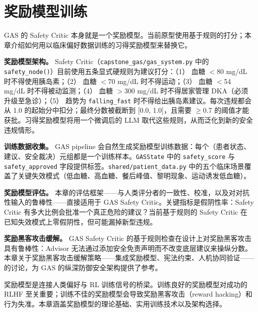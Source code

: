 \chapter{奖励模型训练}
\label{sec:reward-models}

\begin{keybox}
GAS 的 Safety Critic 本身就是一个奖励模型。当前原型使用基于规则的打分；本章介绍如何用以临床偏好数据训练的习得奖励模型来替换它。

\textbf{奖励模型架构。}
Safety Critic（\texttt{capstone\_gas/gas\_system.py} 中的 \texttt{safety\_node()}）目前使用五条显式硬规则为建议打分：（1） 血糖 $<$80 mg/dL 时不得使用胰岛素；（2） 血糖 $<$70 mg/dL 时不得运动；（3） 血糖 $<$54 mg/dL 时不得被动监测；（4） 血糖 $>$300 mg/dL 时不得居家管理 DKA（必须升级至急诊）；（5） 趋势为 \texttt{falling\_fast} 时不得给出胰岛素建议。每次违规都会从 1.0 的起始分中扣分；最终分数被截断到 [0.0, 1.0]，且需要 $\geq$0.7 的阈值才能获批。习得奖励模型将用一个微调后的 LLM 取代这些规则，从而泛化到新的安全违规情形。

\textbf{训练数据收集。}
GAS pipeline 会自然生成奖励模型训练数据：每个（患者状态、建议、安全裁决）元组都是一个训练样本。\texttt{GASState} 中的 \texttt{safety\_score} 与 \texttt{safety\_approved} 字段提供标签。\texttt{shared/patient\_data.py} 中的五个临床场景覆盖了关键失效模式（低血糖、高血糖、餐后峰值、黎明现象、运动诱发低血糖）。

\textbf{奖励模型评估。}
本章的评估框架——与人类评分者的一致性、校准，以及对对抗性输入的鲁棒性——直接适用于 GAS Safety Critic。关键指标是假阴性率：Safety Critic 有多大比例会批准一个真正危险的建议？当前基于规则的 Safety Critic 在已知失效模式上零假阴性，但可能漏掉新型违规。

\textbf{奖励黑客攻击缓解。}
GAS Safety Critic 的基于规则检查在设计上对奖励黑客攻击具有鲁棒性：Advisor 无法通过添加安全免责声明而不改变底层建议来操纵分数。本章关于奖励黑客攻击缓解策略——集成奖励模型、宪法约束、人机协同验证——的讨论，为 GAS 的纵深防御安全架构提供了参考。
\end{keybox}

奖励模型是连接人类偏好与 RL 训练信号的桥梁。训练良好的奖励模型对成功的 RLHF 至关重要；训练不佳的奖励模型会导致奖励黑客攻击（reward hacking）和行为失准。本章涵盖奖励模型的理论基础、实用训练技术以及架构选择。

